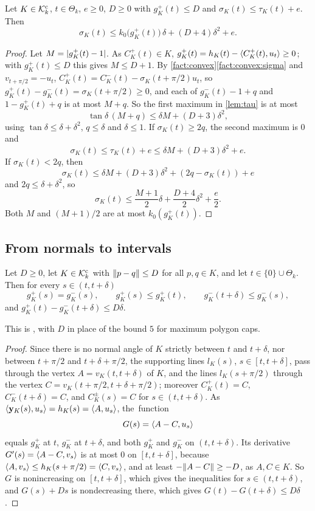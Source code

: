 \begin{lemma}\label{lem:curv-defect}
Let $K\in\mathcal{K}^{\mathrm{c}}_k$, $t\in\Theta_k$, $e\ge0$, $D\ge0$ with $g_K^+(t)\le D$ and
$\sigma_K(t)\le\tau_K(t)+e$. Then
\[
  \sigma_K(t)\le k_0\bigl(g_K^+(t)\bigr)\,\delta+(D+4)\delta^2+e .
\]
\end{lemma}

\begin{proof}
Let $M=\lvert g_K^+(t)-1\rvert$. As $C_K^+(t)\in K$,
$g_K^+(t)=h_K(t)-\langle C_K^+(t),u_t\rangle\ge0$; with $g_K^+(t)\le D$ this gives $M\le
D+1$. By \cref{fact:convex}\ref{fact:convex:sigma} and $v_{t+\pi/2}=-u_t$,
$C_K^+(t)=C_K^-(t)-\sigma_K(t+\pi/2)u_t$, so
$g_K^+(t)-g_K^-(t)=\sigma_K(t+\pi/2)\ge0$, and each of $g_K^-(t)-1+q$ and
$1-g_K^+(t)+q$ is at most $M+q$. So the first maximum in \cref{lem:tau} is at
most
\[
  \tan\delta\,(M+q)\le\delta M+(D+3)\delta^2,
\]
using $\tan\delta\le\delta+\delta^2$, $q\le\delta$ and $\delta\le1$. If
$\sigma_K(t)\ge2q$, the second maximum is $0$ and
\[
  \sigma_K(t)\le\tau_K(t)+e\le\delta M+(D+3)\delta^2+e.
\]
If $\sigma_K(t)<2q$, then
\[
  \sigma_K(t)\le\delta M+(D+3)\delta^2+(2q-\sigma_K(t))+e
\]
and $2q\le\delta+\delta^2$, so
\[
  \sigma_K(t)\le\frac{M+1}2\delta+\frac{D+4}2\delta^2+\frac e2.
\]
Both $M$ and $(M+1)/2$ are at most $k_0(g_K^+(t))$.
\end{proof}

\subsection{From normals to intervals}

\begin{lemma}\label{lem:cell}
Let $D\ge0$, let $K\in\mathcal{K}^{\mathrm{c}}_k$ with $\lVert p-q\rVert\le D$ for all $p,q\in K$, and let
$t\in\{0\}\cup\Theta_k$. Then for every $s\in(t,t+\delta)$
\[
  g_K^+(s)=g_K^-(s),\qquad g_K^+(s)\le g_K^+(t),\qquad g_K^-(t+\delta)
    \le g_K^-(s),
\]
and $g_K^+(t)-g_K^-(t+\delta)\le D\delta$.
\end{lemma}

This is , with $D$ in place of the bound $5$ for maximum
polygon caps.

\begin{proof}
Since there is no normal angle of $K$ strictly between $t$ and $t+\delta$, nor
between $t+\pi/2$ and $t+\delta+\pi/2$, the supporting lines $l_K(s)$,
$s\in[t,t+\delta]$, pass through the vertex $A=v_K(t,t+\delta)$ of $K$, and the
lines $l_K(s+\pi/2)$ through the vertex $C=v_K(t+\pi/2,t+\delta+\pi/2)$;
moreover $C_K^+(t)=C$, $C_K^-(t+\delta)=C$, and $C_K^\pm(s)=C$ for
$s\in(t,t+\delta)$. As $\langle \mathbf{y}_K(s),u_s\rangle=h_K(s)=\langle A,u_s\rangle$, the~function
\[
  G(s)=\langle A-C,u_s\rangle
\]
equals $g_K^+$ at $t$, $g_K^-$ at $t+\delta$, and both $g_K^+$ and $g_K^-$ on
$(t,t+\delta)$. Its derivative $G'(s)=\langle A-C,v_s\rangle$ is at most $0$ on
$[t,t+\delta]$, because $\langle A,v_s\rangle\le h_K(s+\pi/2)=\langle C,v_s\rangle$, and at least
$-\lVert A-C\rVert\ge-D$, as $A,C\in K$. So $G$ is nonincreasing on $[t,t+\delta]$,
which gives the inequalities for $s\in(t,t+\delta)$, and $G(s)+Ds$ is
nondecreasing there, which gives $G(t)-G(t+\delta)\le D\delta$.
\end{proof}

